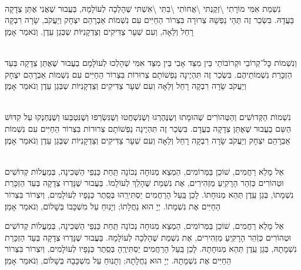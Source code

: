 \documentclass[twoside, openany, parskip=half, 11pt]{book}
\begin{document}
\\
נִשְׁמַת אִמִּי מוֹרָתִי \textbackslash זְקֶנְתּי \textbackslash אֲחוׂתִי \textbackslash בִּתִּי \textbackslash אִשְׁתּי
שֶׁהָלְכָה לְעוֹלָמָהּ, בַּעֲבוּר שֶׁאֲנִי אֶתֵּן צְדָקָה בַּעֲדָהּ. בִּשְׂכַר זֶה תְּהֵי נַפְשָׁהּ צְרוּרָה בִּצְרוֹר הַחַיִּים עִם נִשְׁמוֹת אַבְרָהַם יִצְחָק וְיַעֲקֹב, שָׂרָה רִבְקָה רָחֵל וְלֵאָה, וְעִם שְׁעָר צַדִּיקִים וְצַדְקָנִיּוֹת שְבְּגַן עֵדֶן. וְנֹאמַר אָמֶן׃

 \\
וְנִשְׁמוֹת כׇּל־קְרוֹבַי וּקְרוֹבוֹתַי בֵּין מִצַּד אָבִי בֵּין מִצַּד אִמִּי
שְׁהָלְכוּ לְעוׂלָמָם
בַעֲבוּר שֶׁאֶתֵּן צְדָקָה בְּעַד הַזְכָּרַת נִשְׁמוֹתֵיהֶם. בִּשְׂכַר זֶה תִּהְיֶינָה נַפְשׁוֹתָם צְרוּרוֹת בִּצְרוֹר הַחַיִּים עִם נִשְׁמוֹת אַבְרָהַם יִצְחָק וְיַעֲקֹב שָׂרָה רִבְקָה רָחֵל וְלֵאָה וְעִם שְׁעָר צַדִּיקִים וְצַדְקָנִיּוֹת שְבְּגַן עֵדֶן וְנֹאמַר אָמֶן׃



\\
נִשְׁמוׂת הַקְּדוׂשִׁים וְהַטְּהוׂרִים
שֶׁהוּמָתוּ וְשֶנֶּהֶרְגוּ וְשֶׁנִּשְׁחֲטוּ וְשֶׁנִּשְׂרְפוּ וְשֶׁנִּטְבְּעוּ וְשֶׁנֶּחְנְקוּ עַל קִדּוּשׁ הַשֵּם בַעֲבוּר שֶׁאֶתֵּן צְדָקָה בְּעֲדָם. בִּשְׂכַר זֶה תִּהְיֶינָה נַפְשׁוֹתָם צְרוּרוֹת בִּצְרוֹר הַחַיִּים עִם נִשְׁמוֹת אַבְרָהַם יִצְחָק וְיַעֲקֹב שָׂרָה רִבְקָה רָחֵל וְלֵאָה וְעִם שְׁעָר צַדִּיקִים וְצַדְקָנִיּוֹת שְבְּגַן עֵדֶן וְנֹאמַר אָמֶן׃

\\
אֵל מָלֵא רַחֲמִים, שׁוֹכֵן בַּמְּרוֹמִים, הַמְצֵא מְנוּחָה נְכוֹנָה תַּֽחַת כַּנְפֵי הַשְּׁכִינָה, בְּמַעֲלוֹת קְדוֹשִׁים וּטְהוֹרִים כְּזֹֽהַר הָרָקִֽיעַ מַזְהִירִים, אֶת נִשְׁמַת  שֶׁהָלַךְ לְעוֹלָמוֹ. בַּעֲבוּר שֶׁנָּדְרוּ צְדָקָה בְּעַד הַזְכָּרַת נִשְׁמָתוֹ, בְּגַן עֵֽדֶן תְּהֵא מְנוּחָתוֹ. לָכֵן בַּֽעַל הָרַחֲמִים יַסְתִּירֵֽהוּ בְּסֵֽתֶר כְּנָפָיו לְעוֹלָמִים, וְיִצְרוֹר בִּצְרוֹר הַחַיִּים אֶת נִשְׁמָתוֹ. יְיָ הוּא נַחֲלָתוֹ; וְיָנֽוּחַ עַל מִשְׁכָּבוֹ בְּשָׁלוֹם, וְנֹאמַר אָמֵן׃

אֵל מָלֵא רַחֲמִים, שׁוֹכֵן בַּמְּרוֹמִים, הַמְצֵא מְנוּחָה נְכוֹנָה תַּֽחַת כַּנְפֵי הַשְּׁכִינָה, בְּמַעֲלוֹת קְדוֹשִׁים וּטְהוֹרִים כְּזֹֽהַר הָרָקִֽיעַ מַזְהִירִים, אֶת נִשְׁמַת  שֶׁהָלְכָה לְעוֹלָמָהּ. בַּעֲבוּר שֶׁנָּדְרוּ צְדָקָה בְּעַד הַזְכָּרַת נִשְׁמָתָהּ, בְּגַן עֵֽדֶן תְּהֵא מְנוּחָתָהּ. לָכֵן בַּֽעַל הָרַחֲמִים יַסְתִּירֶֽהָ בְּסֵֽתֶר כְּנָפָיו לְעוֹלָמִים, וְיִצְרוֹר בִּצְרוֹר הַחַיִּים אֶת נִשְׁמָתָהּ. יְיָ הוּא נַחֲלָתָהּ; וְתָנֽוּחַ עַל מִשְׁכָּבָהּ בְּשָׁלוֹם, וְנֹאמַר אָמֵן׃
\end{document}
